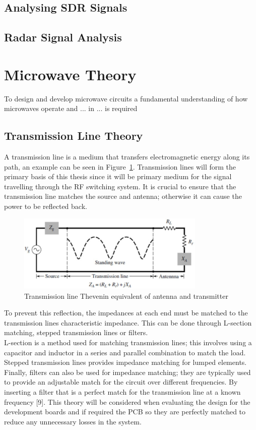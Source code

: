 \documentclass[12pt,openany,a4paper]{book}
\newcommand{\fig}[1]  {Figure~\ref{#1}}		%
\begin{document}
\subsection{Analysing SDR Signals}

\subsection{Radar Signal Analysis}



\section{Microwave Theory}
To design and develop microwave circuits a fundamental understanding of how microwaves operate and ... in ... is required

\subsection{Transmission Line Theory}
A transmission line is a medium that transfers electromagnetic energy along its path, an example can be seen in \fig{fig:tline}. Transmission lines will form the primary basis of this thesis since it will be primary medium for the signal travelling through the RF switching system. It is crucial to ensure that the transmission line matches the source and antenna; otherwise it can cause the power to be reflected back. \newline
\begin{figure}[h]
	\centering
    \includegraphics[width=0.8\textwidth]{tline.png}
	\caption{Transmission line Thevenin equivalent of antenna and transmitter}
	\label{fig:tline}
\end{figure} 
To prevent this reflection, the impedances at each end must be matched to the transmission lines characteristic impedance. This can be done through L-section matching, stepped transmission lines or filters.  \\[0.1cm]
L-section is a method used for matching transmission lines; this involves using a capacitor and inductor in a series and parallel combination to match the load. Stepped transmission lines provides impedance matching for lumped elements. Finally, filters can also be used for impedance matching; they are typically used to provide an adjustable match for the circuit over different frequencies. By inserting a filter that is a perfect match for the transmission line at a known frequency [9]. This theory will be considered when evaluating the design for the development boards and if required the PCB so they are perfectly matched to reduce any unnecessary losses in the system.
\end{document}
